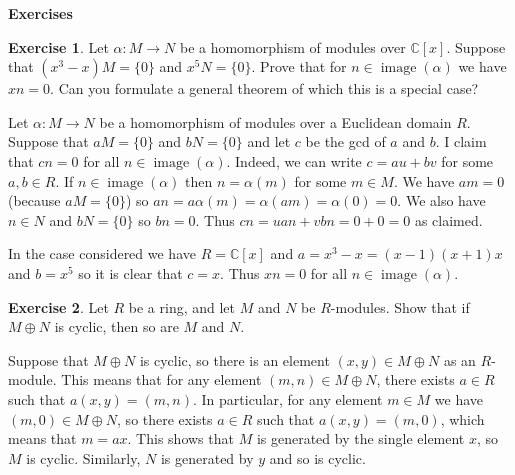\documentclass{amsart}
\newcommand{\img}       {\operatorname{image}}
\newcommand{\C}         {{\mathbb{C}}}
\newcommand{\al}        {\alpha}
\newcommand{\xra}       {\xrightarrow}
\newcommand{\ip}[1]     {\langle #1\rangle}
\newcommand{\op}        {\oplus}
\renewcommand{\:}{\colon}
\theoremstyle{definition}
\newtheorem{exercise}{Exercise}[section]
\renewenvironment{solution}{\SolutionAtEnd}{\endSolutionAtEnd}
\begin{document}

\begin{center}
 \Large \textbf{Exercises}
\end{center}

\begin{exercise}
 Let $\al\:M\xra{}N$ be a homomorphism of modules over $\C[x]$.
 Suppose that $(x^3-x)M=\{0\}$ and $x^5N=\{0\}$.  Prove that for
 $n\in\img(\al)$ we have $xn=0$.  Can you formulate a general theorem
 of which this is a special case?
\end{exercise}
\begin{solution}
 Let $\al\:M\xra{}N$ be a homomorphism of modules over a Euclidean
 domain $R$.  Suppose that $aM=\{0\}$ and $bN=\{0\}$ and let $c$ be
 the gcd of $a$ and $b$.  I claim that $cn=0$ for all
 $n\in\img(\al)$.  Indeed, we can write $c=au+bv$ for some
 $a,b\in R$.  If $n\in\img(\al)$ then $n=\al(m)$ for some $m\in M$.
 We have $am=0$ (because $aM=\{0\}$) so
 $an=a\al(m)=\al(am)=\al(0)=0$.  We also have $n\in N$ and $bN=\{0\}$
 so $bn=0$.  Thus $cn=uan+vbn=0+0=0$ as claimed.

 In the case considered we have $R=\C[x]$ and $a=x^3-x=(x-1)(x+1)x$
 and $b=x^5$ so it is clear that $c=x$.  Thus $xn=0$ for all
 $n\in\img(\al)$. 
\end{solution}

\begin{exercise}
 Let $R$ be a ring, and let $M$ and $N$ be $R$-modules.  Show that if
 $M\op N$ is cyclic, then so are $M$ and $N$.
\end{exercise}
\begin{solution}
 Suppose that $M\op N$ is cyclic, so there is an element
 $(x,y)\in M\op N$ as an $R$-module.  This means that for any element
 $(m,n)\in M\op N$, there exists $a\in R$ such that $a(x,y)=(m,n)$.
 In particular, for any element $m\in M$ we have $(m,0)\in M\op N$, so
 there exists $a\in R$ such that $a(x,y)=(m,0)$, which means that
 $m=ax$.  This shows that $M$ is generated by the single element $x$,
 so $M$ is cyclic.  Similarly, $N$ is generated by $y$ and so is
 cyclic.
\end{solution}
\end{document}
